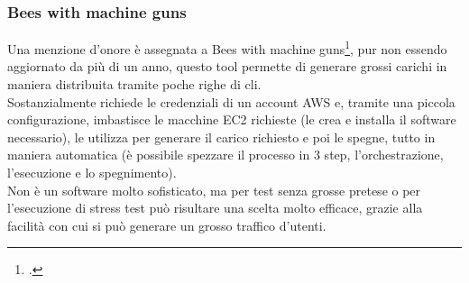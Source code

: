 \subsubsection{Bees with machine guns}
Una menzione d’onore è assegnata a Bees with machine guns\footcite{site:bees}, pur non essendo aggiornato da più di un anno, questo tool permette di generare grossi carichi in maniera distribuita tramite poche righe di \gls{cli}.\\
Sostanzialmente richiede le credenziali di un account AWS e, tramite una piccola configurazione, imbastisce le macchine EC2 richieste (le crea e installa il software necessario), le utilizza per generare il carico richiesto e poi le spegne, tutto in maniera automatica (è possibile spezzare il processo in 3 step, l’orchestrazione, l’esecuzione e lo spegnimento).\\
Non è un software molto sofisticato, ma per test senza grosse pretese o per l'esecuzione di stress test può risultare una scelta molto efficace,  grazie alla facilità con cui si può generare un grosso traffico d'utenti. 

